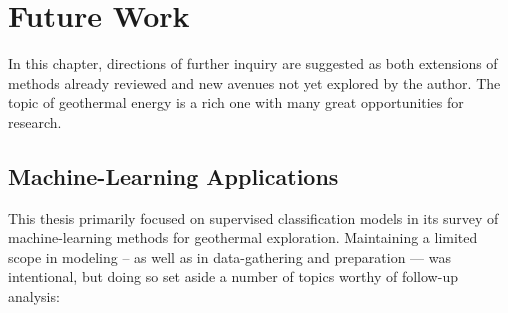 \chapter{Future Work}
\label{ch9:future_work}

In this chapter, directions of further inquiry are suggested as both extensions of methods already reviewed and new avenues not yet explored by the author. The topic of geothermal energy is a rich one with many great opportunities for research.

\section{Machine-Learning Applications}\label{ch9:future_work_ml}

This thesis primarily focused on supervised classification models in its survey of machine-learning methods for geothermal exploration. Maintaining a limited scope in modeling -- as well as in data-gathering and preparation --- was intentional, but doing so set aside a number of topics worthy of follow-up analysis:
